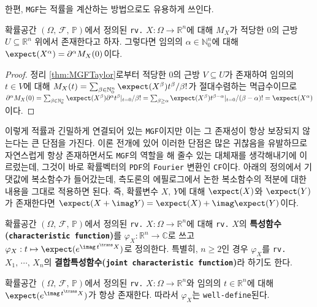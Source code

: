 한편, \texttt{MGF}는 적률을 계산하는 방법으로도 유용하게 쓰인다.

\begin{theorem}\label{thm:MGFDifferentiation}
    확률공간 $(\Omega,\,\mathcal{F},\,\mathbb{P})$에서 정의된 \texttt{rv.} $X:\Omega\to\mathbb{R}^n$에 대해 $M_X$가 적당한 $0$의 근방 $U\subseteq\mathbb{R}^n$ 위에서 존재한다고 하자. 그렇다면 임의의 $\alpha\in\mathbb{N}_0^n$에 대해 $\expect(X^\alpha)=\partial^\alpha M_X(0)$이다.
\end{theorem}

\begin{proof}
    정리 \ref{thm:MGFTaylor}로부터 적당한 $0$의 근방 $V\subseteq U$가 존재하여 임의의 $t\in V$에 대해 $M_X(t)=\sum_{\beta\in\mathbb{N}_0^n}\expect(X^\beta)t^\beta/\beta!$가 절대수렴하는 멱급수이므로 $\partial^\alpha M_X(0)=\sum_{\beta\in\mathbb{N}_0^n}\expect(X^\beta)\partial^\alpha t^\beta\vert_{t=0}/\beta!=\sum_{\beta\geq\alpha}\expect(X^\beta)t^{\beta-\alpha}\vert_{t=0}/(\beta-\alpha)!=\expect(X^\alpha)$이다.
\end{proof}

이렇게 적률과 긴밀하게 연결되어 있는 \texttt{MGF}이지만 이는 그 존재성이 항상 보장되지 않는다는 큰 단점을 가진다. 이론 전개에 있어 이러한 단점은 많은 귀찮음을 유발하므로 자연스럽게 항상 존재하면서도 \texttt{MGF}의 역할을 해 줄수 있는 대체재를 생각해내기에 이르렀는데, 그것이 바로 확률벡터의 \texttt{PDF}의 \texttt{Fourier} 변환인 \texttt{CF}이다. 아래의 정의에서 기댓값에 복소함수가 들어갔는데, 측도론의 에필로그에서 논한 복소함수의 적분에 대한 내용을 그대로 적용하면 된다. 즉, 확률변수 $X,\,Y$에 대해 $\expect(X)$와 $\expect(Y)$가 존재한다면 $\expect(X+\imag Y)=\expect(X)+\imag\expect(Y)$이다.

\begin{definition}
    확률공간 $(\Omega,\,\mathcal{F},\,\mathbb{P})$에서 정의된 \texttt{rv.} $X:\Omega\to\mathbb{R}^n$에 대해 \texttt{rv.} $X$의 \textbf{특성함수(\texttt{characteristic function})}를 $\varphi_X:\mathbb{R}^n\to\mathbb{C}$로 쓰고 $\varphi_X:t\mapsto\expect(e^{\imag\,t^\trans X})$로 정의한다. 특별히, $n\geq2$인 경우 $\varphi_X$를 \texttt{rv.} $X_1,\,\cdots,\,X_n$의 \textbf{결합특성함수(\texttt{joint characteristic function})}라 하기도 한다.
\end{definition}

\begin{proposition}
    확률공간 $(\Omega,\,\mathcal{F},\,\mathbb{P})$에서 정의된 \texttt{rv.} $X:\Omega\to\mathbb{R}^n$와 임의의 $t\in\mathbb{R}^n$에 대해 $\expect(e^{\imag\,t^\trans X})$가 항상 존재한다. 따라서 $\varphi_X$는 \texttt{well-define}된다.
\end{proposition}

